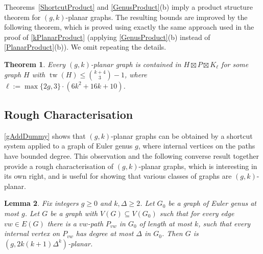 \documentclass{patmorin}
\theoremstyle{plain}
\newtheorem{thm}{Theorem}
\newtheorem{lem}[thm]{Lemma}
\theoremstyle{definition}
\newcommand{\note}[2]{\noindent{\color{red}[#1:~#2]}}
\DeclareMathOperator{\tw}{tw}
\renewcommand{\geq}{\geqslant}
\renewcommand{\leq}{\leqslant}
\begin{document}
Theorems~\ref{ShortcutProduct}  and \ref{GenusProduct}(b) imply a product structure theorem for $(g,k)$-planar graphs. The resulting bounds are improved by the following theorem, which is proved using exactly the same approach used in the proof of \cref{kPlanarProduct} (applying \cref{GenusProduct}(b) instead of \cref{PlanarProduct}(b)). We omit repeating the details.

\begin{thm}
\label{gkPlanarProduct}
Every $(g,k)$-planar graph is contained in $H\boxtimes P \boxtimes K_\ell$ for some graph $H$ with $\tw(H) \leq \binom{k+4}{3}-1$, where $\ell:=\max\{2g,3\}\cdot(6k^2+16k+10)$.
\end{thm}






\subsection{Rough Characterisation}
\label{Characterisation}

\cref{gAddDummy} shows that $(g,k)$-planar graphs can be obtained by a shortcut system applied to a graph of Euler genus $g$, where internal vertices on the paths have bounded degree. This observation and the following converse result together provide a rough characterisation of $(g,k)$-planar graphs, which is interesting in its own right, and is useful for showing that various classes of graphs are $(g,k)$-planar.

\begin{lem}
  \label{DrawG}
  Fix integers $g\geq 0$ and $k,\Delta\geq 2$.
  Let $G_0$ be a graph of Euler genus at most $g$. Let $G$ be
  a graph with $V(G) \subseteq V(G_0)$ such that for every edge $vw \in
  E(G)$ there is a $vw$-path $P_{vw}$ in $G_0$ of length at most $k$, such
  that every internal vertex on $P_{vw}$ has degree at most $\Delta$ in
  $G_0$. Then $G$ is $(g, 2k(k+1)\Delta^{k} )$-planar.
\end{lem}
\end{document}

